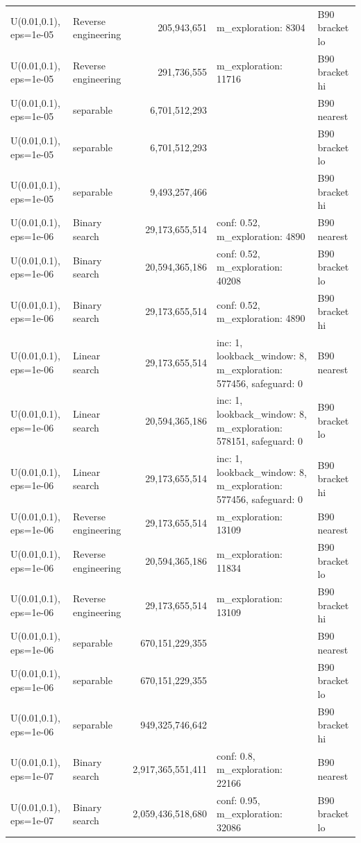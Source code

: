 \begin{tabular}{llrll}
U(0.01,0.1), eps=1e-05 & Reverse engineering & 205,943,651 & m\_exploration: 8304 & B90 bracket lo \\
U(0.01,0.1), eps=1e-05 & Reverse engineering & 291,736,555 & m\_exploration: 11716 & B90 bracket hi \\
U(0.01,0.1), eps=1e-05 & separable & 6,701,512,293 &  & B90 nearest \\
U(0.01,0.1), eps=1e-05 & separable & 6,701,512,293 &  & B90 bracket lo \\
U(0.01,0.1), eps=1e-05 & separable & 9,493,257,466 &  & B90 bracket hi \\
U(0.01,0.1), eps=1e-06 & Binary search & 29,173,655,514 & conf: 0.52, m\_exploration: 4890 & B90 nearest \\
U(0.01,0.1), eps=1e-06 & Binary search & 20,594,365,186 & conf: 0.52, m\_exploration: 40208 & B90 bracket lo \\
U(0.01,0.1), eps=1e-06 & Binary search & 29,173,655,514 & conf: 0.52, m\_exploration: 4890 & B90 bracket hi \\
U(0.01,0.1), eps=1e-06 & Linear search & 29,173,655,514 & inc: 1, lookback\_window: 8, m\_exploration: 577456, safeguard: 0 & B90 nearest \\
U(0.01,0.1), eps=1e-06 & Linear search & 20,594,365,186 & inc: 1, lookback\_window: 8, m\_exploration: 578151, safeguard: 0 & B90 bracket lo \\
U(0.01,0.1), eps=1e-06 & Linear search & 29,173,655,514 & inc: 1, lookback\_window: 8, m\_exploration: 577456, safeguard: 0 & B90 bracket hi \\
U(0.01,0.1), eps=1e-06 & Reverse engineering & 29,173,655,514 & m\_exploration: 13109 & B90 nearest \\
U(0.01,0.1), eps=1e-06 & Reverse engineering & 20,594,365,186 & m\_exploration: 11834 & B90 bracket lo \\
U(0.01,0.1), eps=1e-06 & Reverse engineering & 29,173,655,514 & m\_exploration: 13109 & B90 bracket hi \\
U(0.01,0.1), eps=1e-06 & separable & 670,151,229,355 &  & B90 nearest \\
U(0.01,0.1), eps=1e-06 & separable & 670,151,229,355 &  & B90 bracket lo \\
U(0.01,0.1), eps=1e-06 & separable & 949,325,746,642 &  & B90 bracket hi \\
U(0.01,0.1), eps=1e-07 & Binary search & 2,917,365,551,411 & conf: 0.8, m\_exploration: 22166 & B90 nearest \\
U(0.01,0.1), eps=1e-07 & Binary search & 2,059,436,518,680 & conf: 0.95, m\_exploration: 32086 & B90 bracket lo \\

\end{tabular}
